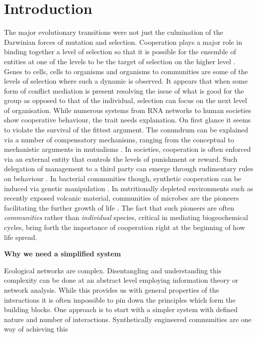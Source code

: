 \section{Introduction}The major evolutionary transitions were not just the culmination of the Darwinian forces of mutation and selection. 
Cooperation plays a major role in binding together a level of selection so that it is possible for the ensemble of entities at one of the levels to be the target of selection on the higher level \citep{maynard-smith:book:1995a}.
Genes to cells, cells to organisms and organisms to communities are some of the levels of selection where such a dynamic is observed.
It appears that when some form of conflict mediation is present resolving the issue of what is good for the group as opposed to that of the individual, selection can focus on the next level of organisation.
While numerous systems from RNA networks to human societies show cooperative behaviour, the trait needs explanation.
On first glance it seems to violate the survival of the fittest argument.
The conundrum can be explained via a number of compensatory mechanisms, ranging from the conceptual \citep{nowak:Science:2006} to mechanistic arguments in mutualisms \citep{akcay:bookchapter:2015}.
In societies, cooperation is often enforced via an external entity that controls the levels of punishment or reward. 
Such delegation of management to a third party can emerge through rudimentary rules on behaviour \citep{sigmund:Nature:2010}.
In bacterial communities though, synthetic cooperation can be induced via genetic manipulation \citep{shou:elife:2015,campbell:elife:2015}.
In nutritionally depleted environments such as recently exposed volcanic material, communities of microbes are the pioneers facilitating the further growth of life \citep{kelly:MicEco:2014,fujimura:SciRep:2016}.
The fact that such pioneers are often \textit{communities} rather than \textit{individual} species,  critical in mediating biogeochemical cycles, bring forth the importance of cooperation right at the beginning of how life spread.

\textbf{Why we need a simplified system}

Ecological networks are complex.
Disentangling and understanding this complexity can be done at an abstract level employing information theory or network analysis.
While this provides us with general properties of the interactions it is often impossible to pin down the principles which form the building blocks.
One approach is to start with a simpler system with defined nature and number of interactions.
Synthetically engineered communities are one way of achieving this \citep{momeni:elife:2013}